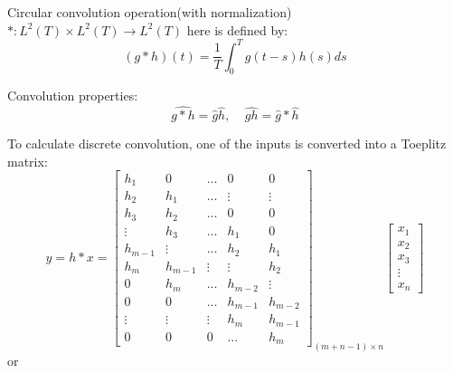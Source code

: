 \documentclass[12pt]{article}
\numberwithin{equation}{section}
\begin{document}
Circular convolution operation(with normalization) $*:L^2(T) \times L^2(T) \rightarrow L^2(T)$ here is defined by:
\begin{equation} \label{eq:circonv}
	 (g * h)(t) = \frac{1}{T} \int^{T}_{0} g(t-s) h(s) ds
\end{equation} \par
Convolution properties: 
\begin{equation}\label{eq:convprop}
	 \widehat{g*h}=\hat{g}\hat{h},\ \ \ \ \  \widehat{gh}=\hat{g}*\hat{h}
\end{equation} \par
To calculate discrete convolution, one of the inputs is converted into a Toeplitz matrix:
\begin{equation} \label{eq:convToep}
 y = h \ast x =
            \begin{bmatrix}
                h_1 & 0 & \ldots & 0 & 0 \\
                h_2 & h_1 & \ldots & \vdots & \vdots \\
                h_3 & h_2 & \ldots & 0 & 0 \\
                \vdots & h_3 & \ldots & h_1 & 0 \\
                h_{m-1} & \vdots & \ldots & h_2 & h_1 \\
                h_m & h_{m-1} & \vdots & \vdots & h_2 \\
                0 & h_m & \ldots & h_{m-2} & \vdots \\
                0 & 0 & \ldots & h_{m-1} & h_{m-2} \\
                \vdots & \vdots & \vdots & h_m & h_{m-1} \\
                0 & 0 & 0 & \ldots & h_m
            \end{bmatrix}_{(m+n-1) \times n}
            \begin{bmatrix}
                x_1 \\
                x_2 \\
                x_3 \\
                \vdots \\
                x_n
            \end{bmatrix}
\end{equation}
or 
\end{document}
